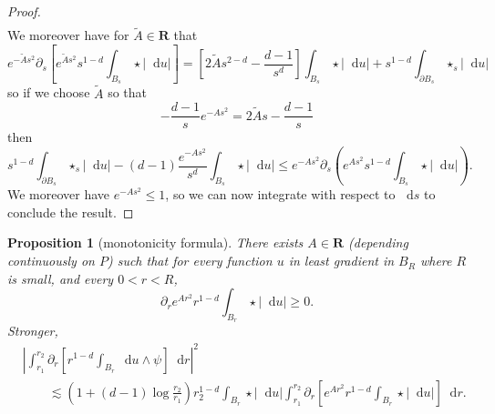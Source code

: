 \documentclass[reqno,12pt,letterpaper]{amsart}
\newcommand{\RR}{\mathbf{R}}
\newcommand*\dif{\mathop{}\!\mathrm{d}}
\newtheorem{proposition}[theorem]{Proposition}
\theoremstyle{definition}
\numberwithin{equation}{section}
\begin{document}
\begin{proof}
\begin{align*}
\end{align*}
We moreover have for $\tilde A \in \RR$ that
$$e^{-\tilde As^2} \partial_s \left[e^{\tilde As^2} s^{1 - d} \int_{B_s} \star |\dif u|\right] = \left[2\tilde As^{2 - d} - \frac{d - 1}{s^d}\right]\int_{B_s} \star |\dif u| + s^{1 - d} \int_{\partial B_s} \star_s |\dif u|$$
so if we choose $\tilde A$ so that
$$-\frac{d - 1}{s} e^{-As^2} = 2\tilde As - \frac{d - 1}{s}$$
then
$$s^{1 - d} \int_{\partial B_s} \star_s |\dif u| - (d - 1)\frac{e^{-As^2}}{s^d} \int_{B_s} \star|\dif u| \leq e^{-As^2} \partial_s\left(e^{As^2} s^{1 - d} \int_{B_s} \star|\dif u|\right).$$
We moreover have $e^{-As^2} \leq 1$, so we can now integrate with respect to $\dif s$ to conclude the result.
\end{proof}

\begin{proposition}[monotonicity formula]\label{Monotonicity Formula}\label{sharp monotonicity}
There exists $A \in \RR$ (depending continuously on $P$) such that for every function $u$ in least gradient in $B_R$ where $R$ is small, and every $0 < r < R$,
\begin{equation}\label{weak monotone}
\partial_r e^{Ar^2} r^{1 - d} \int_{B_r} \star|\dif u| \geq 0.
\end{equation}
Stronger,
\begin{align}\label{strong monotone}
&\left|\int_{r_1}^{r_2} \partial_r \left[r^{1 - d}\int_{B_r} \dif u \wedge \psi\right] \dif r\right|^2 \\
&\qquad \lesssim \left(1 + (d - 1)\log\frac{r_2}{r_1}\right)r_2^{1 - d}\int_{B_r} \star |\dif u| \int_{r_1}^{r_2} \partial_r \left[e^{Ar^2} r^{1 - d}\int_{B_r} \star |\dif u|\right] \dif r.
\end{align}
\end{proposition}
\end{document}
